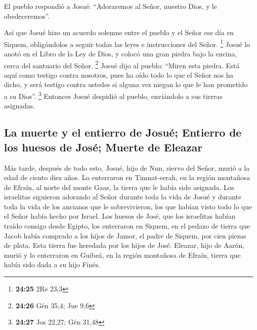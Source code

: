  El pueblo respondió a Josué: ``Adoraremos al Señor,
nuestro Dios, y le obedeceremos''.

 Así que Josué hizo un acuerdo solemne entre el pueblo y
el Señor ese día en Siquem, obligándolos a seguir todas las leyes e
instrucciones del Señor. \footnote{\textbf{24:25} 2Re 23,3}
 Josué lo anotó en el Libro de la Ley de Dios, y colocó
una gran piedra bajo la encina, cerca del santuario del Señor.
\footnote{\textbf{24:26} Gén 35,4; Jue 9,6}  Josué dijo
al pueblo: ``Miren esta piedra. Está aquí como testigo contra nosotros,
pues ha oído todo lo que el Señor nos ha dicho, y será testigo contra
ustedes si alguna vez niegan lo que le han prometido a su Dios''.
\footnote{\textbf{24:27} Jos 22,27; Gén 31,48}  Entonces
Josué despidió al pueblo, enviándolo a sus tierras asignadas.

\hypertarget{la-muerte-y-el-entierro-de-josuuxe9-entierro-de-los-huesos-de-josuxe9-muerte-de-eleazar}{%
\subsection{La muerte y el entierro de Josué; Entierro de los huesos de
José; Muerte de
Eleazar}\label{la-muerte-y-el-entierro-de-josuuxe9-entierro-de-los-huesos-de-josuxe9-muerte-de-eleazar}}

 Más tarde, después de todo esto, Josué, hijo de Nun,
siervo del Señor, murió a la edad de ciento diez años. 
Lo enterraron en Timnat-serah, en la región montañosa de Efraín, al
norte del monte Gaas, la tierra que le había sido asignada.
 Los israelitas siguieron adorando al Señor durante toda
la vida de Josué y durante toda la vida de los ancianos que le
sobrevivieron, los que habían visto todo lo que el Señor había hecho por
Israel.  Los huesos de José, que los israelitas habían
traído consigo desde Egipto, los enterraron en Siquem, en el pedazo de
tierra que Jacob había comprado a los hijos de Jamor, el padre de
Siquem, por cien piezas de plata. Esta tierra fue heredada por los hijos
de José.  Eleazar, hijo de Aarón, murió y lo enterraron
en Guibeá, en la región montañosa de Efraín, tierra que había sido dada
a su hijo Finés.

